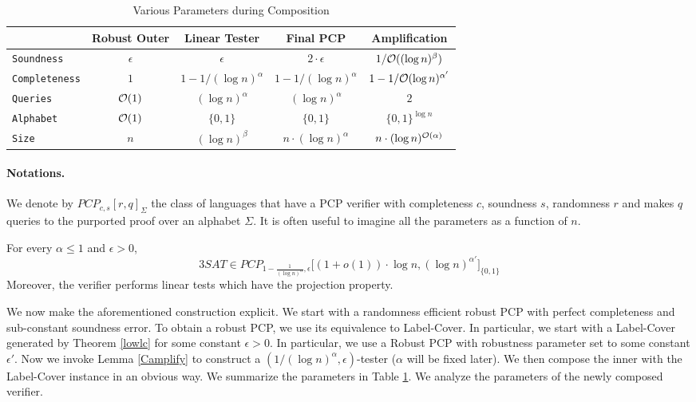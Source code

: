 \begin{table}
\centering
\begin{tabular}{|l|c|c|c|c|}
\hline
\ &  {\sc Robust Outer} & {\sc Linear Tester} & {\sc Final PCP} & {\sc Amplification}\\
\hline
{\tt Soundness} & $\epsilon$  & $\epsilon$ &  $2 \cdot \epsilon$ & $1/{\cal O}((\log n)^\beta)$ \\
{\tt Completeness} & $1$  &  $1 - 1/(\log n)^\alpha$ & $1 - 1/(\log n)^\alpha$ & $1 - 1/{\cal O}(\log n)^{\alpha'}$ \\
{\tt Queries}  &  ${\cal O}(1)$ & $(\log n)^\alpha$ & $(\log n)^\alpha$ & $2$ \\
{\tt Alphabet} & ${\cal O}{(1)}$  & $\{0,1\}$  & $\{0,1\}$ & $\{0,1\}^{\log n}$	 \\
{\tt Size} &  $n$  & $(\log n)^\beta$ & $n \cdot (\log n)^{\alpha}$  & $n \cdot (\log n)^{{\cal O} (\alpha)}$   \\
\hline
\end{tabular} \caption{Various Parameters during Composition} \label{table:compose}
\end{table}

\paragraph {Notations.}  We denote by $PCP_{c,s}\left[r, q\right]_\Sigma$ the class of
languages that have a PCP verifier with completeness $c$, soundness
$s$, randomness $r$ and makes $q$ queries to the purported proof over
an alphabet $\Sigma$. It is often useful to imagine all the parameters as a function of $n$.

\begin{theorem} \label{composedPCP}
For every $\alpha \le 1$ and $\epsilon > 0$, 
\[
		3SAT \in PCP_{{1 - \frac{1}{\left(\log n\right)^{\alpha}}}, \epsilon } \big[ \left(1 + o\left(1\right) \right) \cdot \log n,  (\log n)^{\alpha'} \big ]_{\{0,1\}}
\]
Moreover, the verifier performs linear tests which have the
projection property.
\end{theorem}
 We now make the aforementioned construction
explicit.  We start with a randomness efficient robust PCP with
perfect completeness and sub-constant soundness error. To obtain a
robust PCP, we use its equivalence to {\sc Label-Cover}. In particular, we
start with a {\sc Label-Cover} generated by Theorem \ref{lowlc} for some
constant $\epsilon > 0$. In particular, we use a Robust PCP with robustness 
parameter set to some constant $\epsilon'$. Now we invoke
Lemma \ref{Camplify} to construct a $(1/(\log n)^\alpha, \epsilon)$-tester 
($\alpha$ will be fixed later). We then compose the inner with the {\sc Label-Cover} instance in an
obvious way. We summarize the parameters in Table \ref{table:compose}. 
We analyze the parameters of the newly composed verifier.

